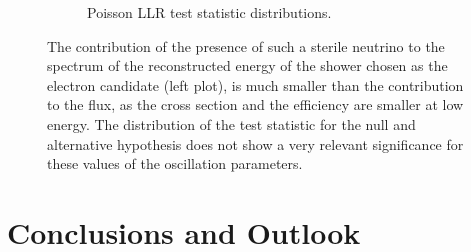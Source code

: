 \documentclass[a4paper]{article}
\begin{document}
\begin{figure}[ht]
\begin{center}
\begin{subfigure}[b]{0.45\textwidth}
    \caption{Poisson LLR test statistic distributions.}
    \end{subfigure}
\caption{The contribution of the presence of such a sterile neutrino to the spectrum of the reconstructed energy of the shower chosen as the electron candidate (left plot), is much smaller than the contribution to the flux, as the cross section and the efficiency are smaller at low energy.
The distribution of the test statistic for the null and alternative hypothesis does not show a very relevant significance for these values of the oscillation parameters.}
\label{fig:oscillation_sensitivity}
\end{center}
\end{figure}




\newpage
\section{Conclusions and Outlook}
\end{document}
